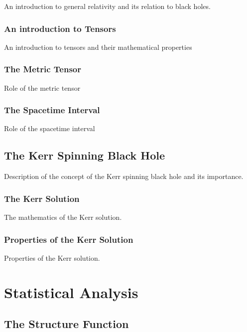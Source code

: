 \documentclass[12pt, oneside]{smuthesis}
\begin{document}
An introduction to general relativity and its relation to black holes.

\subsection{\sc An introduction to Tensors} \label{tensorIntro}

An introduction to tensors and their mathematical properties

\subsection{\sc The Metric Tensor} \label{metricTensor}

Role of the metric tensor

\subsection{\sc The Spacetime Interval} \label{spacetimeInterval}

Role of the spacetime interval

\section{\sc The Kerr Spinning Black Hole} \label{kerrSpinningBH}

Description of the concept of the Kerr spinning black hole and its importance.

\subsection{\sc The Kerr Solution} \label{kerrSolution}

The mathematics of the Kerr solution.

\subsection{\sc Properties of the Kerr Solution} \label{kerrSolutionProperties}

Properties of the Kerr solution.

\chapter{\sc Statistical Analysis} \label{statisticalAnalysis}

\section{\sc The Structure Function} \label{structureFunction}
\end{document}
